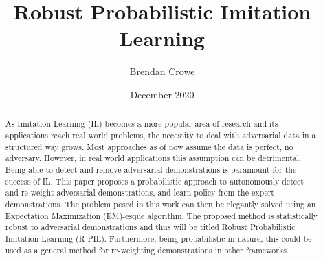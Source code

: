 \documentclass{article}
\title{Robust Probabilistic Imitation Learning}
\author{Brendan Crowe}
\date{December 2020}
\begin{document}
\maketitle

\begin{abstract}
    As Imitation Learning (IL) becomes a more popular area of research and its applications reach real world problems, the necessity to deal with adversarial data in a structured way grows. Most approaches as of now assume the data is perfect, no adversary. However, in real world applications this assumption can be detrimental. Being able to detect and remove adversarial demonstrations is paramount for the success of IL. This paper proposes a probabilistic approach to autonomously detect and re-weight adversarial demonstrations, and learn  policy from the expert demonstrations. The problem posed in this work can then be elegantly solved using an Expectation Maximization (EM)-esque algorithm. The proposed method is statistically robust to adversarial demonstrations and thus will be titled Robust Probabilistic Imitation Learning (R-PIL). Furthermore, being probabilistic in nature, this could be used as a general method for re-weighting demonstrations in other frameworks.
\end{abstract}
\end{document}
